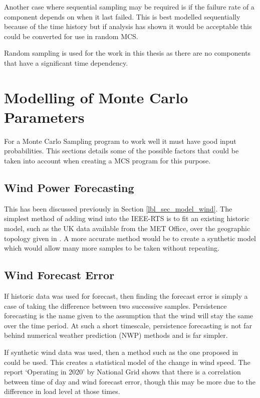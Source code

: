 \documentclass[a4paper,oneside,12pt]{report}
\begin{document}
Another case where sequential sampling may be required is if the failure rate of a component depends on when it last failed. This is best modelled sequentially because of the time history but if analysis has shown it would be acceptable this could be converted for use in random MCS.

Random sampling is used for the work in this thesis as there are no components that have a significant time dependency.

\section{Modelling of Monte Carlo Parameters}

For a Monte Carlo Sampling program to work well it must have good input probabilities. This sections details some of the possible factors that could be taken into account when creating a MCS program for this purpose.

\subsection{Wind Power Forecasting}

This has been discussed previously in Section \ref{lbl_sec_model_wind}. The simplest method of adding wind into the IEEE-RTS is to fit an existing historic model, such as the UK data available from the MET Office, over the geographic topology given in \cite{Grigg1999}. A more accurate method would be to create a synthetic model which would allow many more samples to be taken without repeating.

\subsection{Wind Forecast Error}

If historic data was used for forecast, then finding the forecast error is simply a case of taking the difference between two successive samples. Persistence forecasting is the name given to the assumption that the wind will stay the same over the time period. At such a short timescale, persistence forecasting is not far behind numerical weather prediction (NWP) methods and is far simpler.

If synthetic wind data was used, then a method such as the one proposed in \cite{Bathurst2002} could be used. This creates a statistical model of the change in wind speed. The report `Operating in 2020' by National Grid \cite{Grid2009} shows that there is a correlation between time of day and wind forecast error, though this may be more due to the difference in load level at those times.
\end{document}
